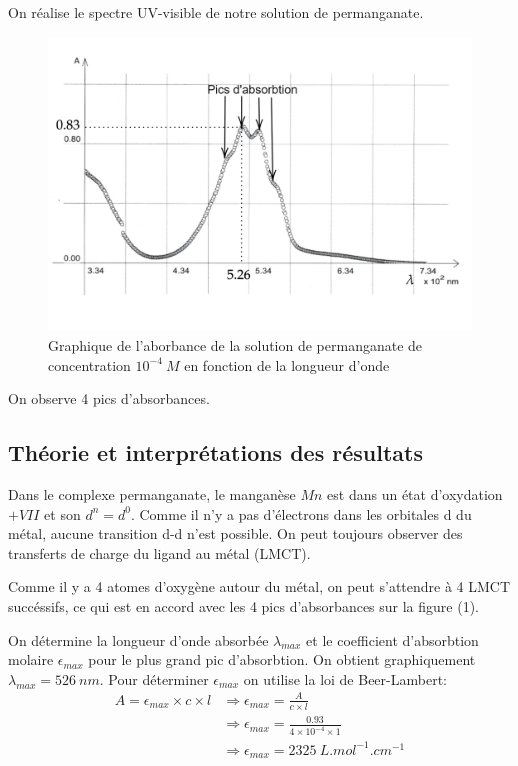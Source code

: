 \documentclass[12pt]{article}
\begin{document}
On réalise le spectre UV-visible de notre solution de permanganate.
\begin{figure}[h!]
    \begin{center}
        \includegraphics[scale=0.7]{Spectre1_Inorga_bis.jpeg}
        \caption{Graphique de l'aborbance de la solution de permanganate de concentration $10^{-4} \ M$ en fonction de la longueur d'onde}
        \label{img1:Spectre_permanganate}
    \end{center}
\end{figure}

On observe 4 pics d'absorbances. 

\subsection{Théorie et interprétations des résultats}

Dans le complexe permanganate, le manganèse $Mn$ est dans un état d'oxydation $+ VII$ et son $d^n=d^0$.
Comme il n'y a pas d'électrons dans les orbitales d du métal, aucune transition d-d n'est possible.
On peut toujours observer des transferts de charge du ligand au métal (LMCT). 

Comme il y a 4 atomes d'oxygène autour du métal, on peut s'attendre à 4 LMCT succéssifs, ce qui est en accord avec les 4 pics d'absorbances sur la figure (1).

On détermine la longueur d'onde absorbée $\lambda_{max}$ et le coefficient d'absorbtion molaire $\epsilon_{max}$ pour le plus grand pic d'absorbtion.
On obtient graphiquement $\lambda_{max}=526 \ nm$.
Pour déterminer $\epsilon_{max}$ on utilise la loi de Beer-Lambert:
\begin{align*}
    A=\epsilon_{max} \times c \times l &\Longrightarrow \epsilon_{max}=\frac{A}{c \times l} \\
      &\Longrightarrow \epsilon_{max}=\frac{0.93}{4 \times 10^{-4} \times 1} \\
      &\Longrightarrow \epsilon_{max}=2325 \ L.mol^{-1}.cm^{-1}
\end{align*}
\end{document}
